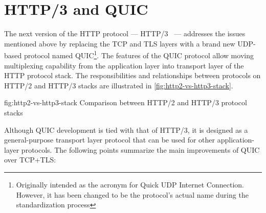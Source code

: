 \section{HTTP/3 and QUIC}

The next version of the HTTP protocol --- HTTP/3~\cite{draft-ietf-quic-http} --- addresses the issues
mentioned above by replacing the TCP and TLS layers with a brand new UDP-based protocol named
QUIC\footnote{Originally intended as the acronym for Quick UDP Internet Connection. However, it has
  been changed to be the protocol's actual name during the standardization process}. The features of
the QUIC protocol allow moving multiplexing capability from the application layer into transport
layer of the HTTP protocol stack. The responsibilities and relationships between protocols on HTTP/2
and HTTP/3 stacks are illustrated in \autoref{fig:http2-vs-http3-stack}.

\begin{myFigure}
  {fig:http2-vs-http3-stack}
  {Comparison between HTTP/2 and HTTP/3 protocol stacks}

  

\end{myFigure}

Although QUIC development is tied with that of HTTP/3, it is designed as a general-purpose transport
layer protocol that can be used for other application-layer protocols. The following points
summarize the main improvements of QUIC over TCP+TLS:

